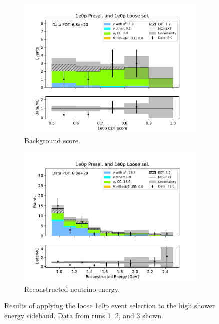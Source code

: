 \begin{figure}[H]
    \centering
    \begin{subfigure}{0.5\linewidth}
        \includegraphics[width=\linewidth]{technote/Sidebands/Figures/ShowerEnergySideband/shr_energy_sideband_bkg_score_run123_ZP_ZPLOOSESEL.pdf}%
        \caption{Background score.}
    \end{subfigure}%
    \begin{subfigure}{0.5\linewidth}
        \includegraphics[width=\linewidth]{technote/Sidebands/Figures/ShowerEnergySideband/shr_energy_sideband_reco_e_run123_ZP_ZPLOOSESEL.pdf}%
        \caption{Reconstructed neutrino energy.}
    \end{subfigure}
    \caption{Results of applying the loose 1e0p event selection to the high shower energy sideband. Data from runs 1, 2, and 3 shown.}
    \label{fig:ShrEnergySideband1e0pRuns123}
\end{figure}


